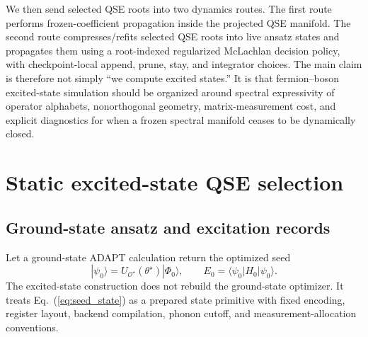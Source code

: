 \documentclass[
  reprint,
  amsmath,
  amssymb,
  aps,
  pra,
  nofootinbib,
  superscriptaddress,
  floatfix
]{revtex4-2}
\newcommand{\Oset}{\mathcal{O}}
\newcommand{\ket}[1]{|#1\rangle}
\newcommand{\bra}[1]{\langle #1|}
\begin{document}
We then send selected QSE roots into two dynamics routes.  The first route performs frozen-coefficient propagation inside the projected QSE manifold.  The second route compresses/refits selected QSE roots into live ansatz states and propagates them using a root-indexed regularized McLachlan decision policy, with checkpoint-local append, prune, stay, and integrator choices.  The main claim is therefore not simply ``we compute excited states.''  It is that fermion--boson excited-state simulation should be organized around spectral expressivity of operator alphabets, nonorthogonal geometry, matrix-measurement cost, and explicit diagnostics for when a frozen spectral manifold ceases to be dynamically closed.

\section{Static excited-state QSE selection}
\label{sec:static_qse_method}

\subsection{Ground-state ansatz and excitation records}

Let a ground-state ADAPT calculation return the optimized seed
\begin{equation}
\ket{\psi_0}
=
U_{\Oset^\star}(\theta^\star)\ket{\Phi_0},
\qquad
E_0=\bra{\psi_0}H_0\ket{\psi_0}.
\label{eq:seed_state}
\end{equation}
The excited-state construction does not rebuild the ground-state optimizer.  It treats Eq.~(\ref{eq:seed_state}) as a prepared state primitive with fixed encoding, register layout, backend compilation, phonon cutoff, and measurement-allocation conventions.
\end{document}
